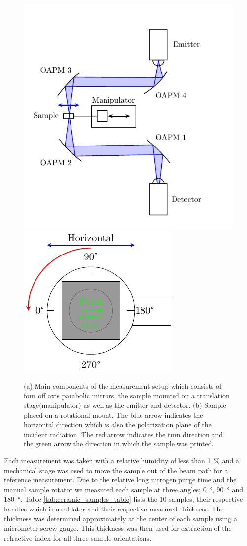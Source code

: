 \begin{figure}[H]
    \centering
    \subcaptionbox{\label{fig:setup_1}}
        {\hspace*{-2em}\includegraphics[width=0.45\linewidth]{images/appendix/Setup-THz-TDS-HHI.pdf}}
    \qquad
    \subcaptionbox{\label{fig:setup_2}}
        {\hspace*{-2em}\includegraphics[width=0.45\linewidth]{images/appendix/sample_mount.pdf}}
    
    \caption{(a) Main components of the measurement setup which consists of four off axis parabolic mirrors, the sample mounted on a translation stage(manipulator) as well as the emitter and detector. (b) Sample placed on a rotational mount. The blue arrow indicates the horizontal direction which is also the polarization plane of the incident radiation. The red arrow indicates the turn direction and the green arrow the direction in which the sample was printed.}
    \label{fig:THz-TDS-HHI}
\end{figure}

Each measurement was taken with a relative humidity of less than \SI{1}{\percent} and a mechanical stage was used to move the sample out of the beam path for a reference measurement. Due to the relative long nitrogen purge time and the manual sample rotator we measured each sample at three angles; \SI{0}{\degree}, \SI{90}{\degree} and \SI{180}{\degree}.
Table \ref{tab:ceramic_samples_table} lists the 10 samples, their respective handles which is used later and their respective measured thickness. The thickness was determined approximately at the center of each sample using a micrometer screw gauge. This thickness was then used for extraction of the refractive index for all three sample orientations. 

